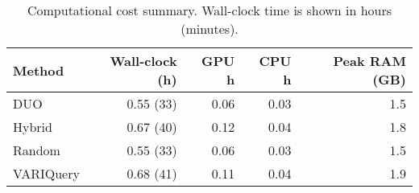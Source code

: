 \begin{table}[h]
  \centering
  \begin{tabular}{lrrrr}
    \toprule
    \textbf{Method} & \textbf{Wall-clock (h)} & \textbf{GPU h} & \textbf{CPU h} & \textbf{Peak RAM (GB)} \\
    \midrule
    DUO        & 0.55 (33)       & 0.06   & 0.03   & 1.5            \\
    Hybrid     & 0.67 (40)       & 0.12   & 0.04   & 1.8            \\
    Random     & 0.55 (33)       & 0.06   & 0.03   & 1.5            \\
    VARIQuery  & 0.68 (41)       & 0.11   & 0.04   & 1.9            \\
    \bottomrule
  \end{tabular}
  \caption{Computational cost summary. Wall-clock time is shown in hours (minutes).}
  \label{tab:results:overhead}
\end{table}